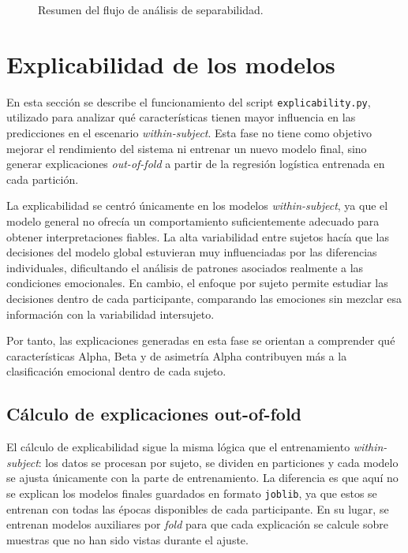 \begin{figure}[H]
{
}
\caption{Resumen del flujo de análisis de separabilidad.}
\label{fig:flujo_separabilidad}
\end{figure}

\section{Explicabilidad de los modelos}

En esta sección se describe el funcionamiento del script \texttt{explicability.py}, utilizado para analizar qué características tienen mayor influencia en las predicciones en el escenario \textit{within-subject}. Esta fase no tiene como objetivo mejorar el rendimiento del sistema ni entrenar un nuevo modelo final, sino generar explicaciones \textit{out-of-fold} a partir de la regresión logística entrenada en cada partición.

La explicabilidad se centró únicamente en los modelos \textit{within-subject}, ya que el modelo general no ofrecía un comportamiento suficientemente adecuado para obtener interpretaciones fiables. La alta variabilidad entre sujetos hacía que las decisiones del modelo global estuvieran muy influenciadas por las diferencias individuales, dificultando el análisis de patrones asociados realmente a las condiciones emocionales. En cambio, el enfoque por sujeto permite estudiar las decisiones dentro de cada participante, comparando las emociones sin mezclar esa información con la variabilidad intersujeto.

Por tanto, las explicaciones generadas en esta fase se orientan a comprender qué características Alpha, Beta y de asimetría Alpha contribuyen más a la clasificación emocional dentro de cada sujeto.

\subsection{Cálculo de explicaciones out-of-fold}

El cálculo de explicabilidad sigue la misma lógica que el entrenamiento \textit{within-subject}: los datos se procesan por sujeto, se dividen en particiones y cada modelo se ajusta únicamente con la parte de entrenamiento. La diferencia es que aquí no se explican los modelos finales guardados en formato \texttt{joblib}, ya que estos se entrenan con todas las épocas disponibles de cada participante. En su lugar, se entrenan modelos auxiliares por \textit{fold} para que cada explicación se calcule sobre muestras que no han sido vistas durante el ajuste.

